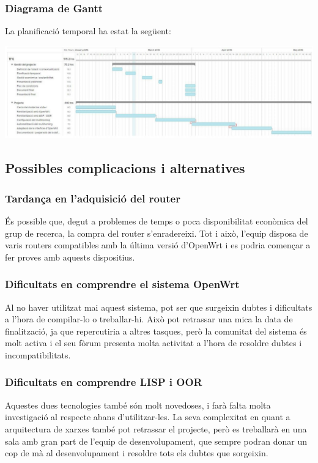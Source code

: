 \documentclass[11pt]{article}
\begin{document}
	\subsubsection{Diagrama de Gantt}
	La planificació temporal ha estat la següent:
	\begin{flushleft}
	\includegraphics[width=14cm]{gantt1}
	\end{flushleft}


\subsection{Possibles complicacions i alternatives}
\subsubsection{Tardança en l’adquisició del router}
És possible que, degut a problemes de temps o poca disponibilitat econòmica del grup de recerca, la compra del router s’enradereixi. Tot i això, l’equip disposa de varis routers compatibles amb la última versió d’OpenWrt i es podria començar a fer proves amb aquests dispositius.
\subsubsection{Dificultats en comprendre el sistema OpenWrt}
Al no haver utilitzat mai aquest sistema, pot ser que surgeixin dubtes i dificultats a l’hora de compilar-lo o treballar-hi. Això pot retrassar una mica la data de finalització, ja que repercutiria a altres tasques, però la comunitat del sistema és molt activa i el seu fòrum presenta molta activitat a l’hora de resoldre dubtes i incompatibilitats.
\subsubsection{Dificultats en comprendre LISP i OOR}
Aquestes dues tecnologies també són molt novedoses, i farà falta molta investigació al respecte abans d’utilitzar-les. La seva complexitat en quant a arquitectura de xarxes també pot retrassar el projecte, però es treballarà en una sala amb gran part de l’equip de desenvolupament, que sempre podran donar un cop de mà al desenvolupament i resoldre tots els dubtes que sorgeixin.
\end{document}
